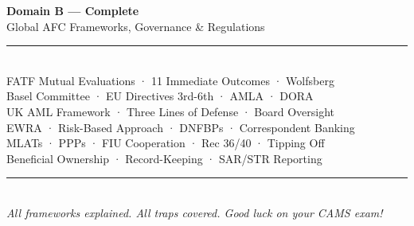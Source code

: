 \documentclass[12pt,aspectratio=169]{beamer}
\begin{document}
	\begin{frame}
		\centering
		\vspace{1.5cm}
		{\fontsize{18}{22}\selectfont \textbf{Domain B — Complete}}\\[0.2cm]
		{\fontsize{11}{13}\selectfont Global AFC Frameworks, Governance \& Regulations}\\[0.1cm]
		\rule{4cm}{0.5pt}\\[0.1cm]
		{\fontsize{8}{10}\selectfont FATF Mutual Evaluations · 11 Immediate Outcomes · Wolfsberg}\\[0.05cm]
		{\fontsize{8}{10}\selectfont Basel Committee · EU Directives 3rd-6th · AMLA · DORA}\\[0.05cm]
		{\fontsize{8}{10}\selectfont UK AML Framework · Three Lines of Defense · Board Oversight}\\[0.05cm]
		{\fontsize{8}{10}\selectfont EWRA · Risk-Based Approach · DNFBPs · Correspondent Banking}\\[0.05cm]
		{\fontsize{8}{10}\selectfont MLATs · PPPs · FIU Cooperation · Rec 36/40 · Tipping Off}\\[0.05cm]
		{\fontsize{8}{10}\selectfont Beneficial Ownership · Record-Keeping · SAR/STR Reporting}\\[0.1cm]
		\rule{4cm}{0.5pt}\\[0.1cm]
		{\fontsize{8}{10}\selectfont \textit{All frameworks explained. All traps covered. Good luck on your CAMS exam!}}
		\vspace{0.5cm}
	\end{frame}
	
\end{document}
